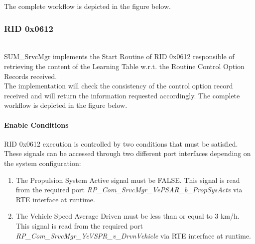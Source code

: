 The complete workflow is depicted in the figure below. \\
{      {}

\label{subsubsec:RID0x0654Flow}

\subsubsection{RID 0x0612}
\label{sec:RID0x0612}
\\
SUM\_SrvcMgr implements the Start Routine of RID 0x0612 responsible of retrieving the content of the Learning Table w.r.t. the Routine Control Option Records received. \\

The implementation will check the consistency of the control option record received and will return the information requested accordingly. The complete workflow is depicted in the figure below.


{}

\paragraph{Enable Conditions}

RID 0x0612 execution is controlled by two conditions that must be satisfied. These signals can be accessed through two different port interfaces depending on the system configuration:

\begin{enumerate}
    \item The Propulsion System Active signal must be FALSE. This signal is read from the required port \textit{RP\_Com\_SrvcMgr\_VePSAR\_b\_PropSysActv} via RTE interface at runtime.
    \item The Vehicle Speed Average Driven must be less than or equal to 3 km/h. This signal is read from the required port \textit{RP\_Com\_SrvcMgr\_YeVSPR\_v\_DrvnVehicle} via RTE interface at runtime.
\end{enumerate}

}
